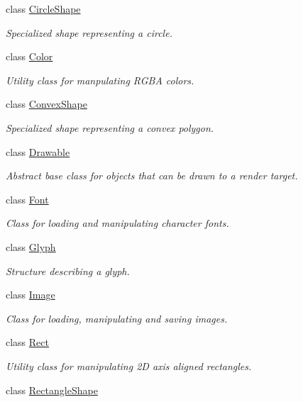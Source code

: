 \begin{DoxyCompactItemize}
class \hyperlink{classsf_1_1_circle_shape}{Circle\-Shape}
\begin{DoxyCompactList}\small\item\em Specialized shape representing a circle. \end{DoxyCompactList}\item 
class \hyperlink{classsf_1_1_color}{Color}
\begin{DoxyCompactList}\small\item\em Utility class for manpulating R\-G\-B\-A colors. \end{DoxyCompactList}\item 
class \hyperlink{classsf_1_1_convex_shape}{Convex\-Shape}
\begin{DoxyCompactList}\small\item\em Specialized shape representing a convex polygon. \end{DoxyCompactList}\item 
class \hyperlink{classsf_1_1_drawable}{Drawable}
\begin{DoxyCompactList}\small\item\em Abstract base class for objects that can be drawn to a render target. \end{DoxyCompactList}\item 
class \hyperlink{classsf_1_1_font}{Font}
\begin{DoxyCompactList}\small\item\em Class for loading and manipulating character fonts. \end{DoxyCompactList}\item 
class \hyperlink{classsf_1_1_glyph}{Glyph}
\begin{DoxyCompactList}\small\item\em Structure describing a glyph. \end{DoxyCompactList}\item 
class \hyperlink{classsf_1_1_image}{Image}
\begin{DoxyCompactList}\small\item\em Class for loading, manipulating and saving images. \end{DoxyCompactList}\item 
class \hyperlink{classsf_1_1_rect}{Rect}
\begin{DoxyCompactList}\small\item\em Utility class for manipulating 2\-D axis aligned rectangles. \end{DoxyCompactList}\item 
class \hyperlink{classsf_1_1_rectangle_shape}{Rectangle\-Shape}

\end{DoxyCompactItemize}
